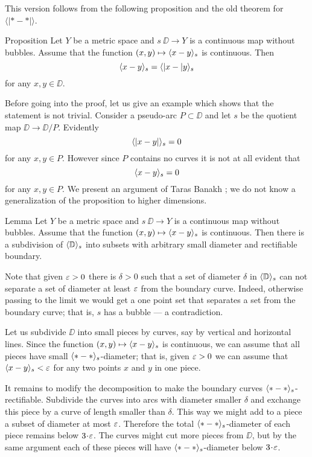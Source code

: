 This version follows from the following proposition and the old theorem for $\langle|{*}-{*}|\rangle$.
 
\begin{thm}{Proposition}\label{prop:<||>=<>}
Let $Y$ be a metric space and $s\:\DD\to Y$ is a continuous map without bubbles.
Assume that the function $(x,y)\mapsto \langle x-y\rangle_s$ is continuous.
Then 
\[\langle x-y\rangle_s=\langle|x-|y\rangle_s\]
for any $x,y\in \DD$.
\end{thm}

Before going into the proof, let us give an example which shows that the statement is not trivial.
Consider a pseudo-arc $P\subset \DD$ and let $s$ be the quotient map $\DD\to \DD/P$.
Evidently 
\[\langle|x-y|\rangle_s=0\]
for any $x,y\in P$.
However since $P$ contains no curves it is not at all evident that 
\[\langle x-y\rangle_s=0\]
for any $x,y\in P$.
We present an argument of Taras Banakh \cite{banakh};
we do not know a generalization of the proposition to higher dimensions.

\begin{thm}{Lemma}\label{lem:subdivision}
Let $Y$ be a metric space and $s\:\DD\to Y$ is a continuous map without bubbles.
Assume that the function $(x,y)\mapsto \langle x-y\rangle_s$ is continuous.
Then there is a subdivision of $\langle\mathbb{D}\rangle_s$ into subsets with arbitrary small diameter and rectifiable boundary.
\end{thm}

Note that given $\varepsilon>0$ there is $\delta>0$ such that a set of diameter $\delta$ in $\langle\mathbb{D}\rangle_s$ can not separate a set of diameter at least $\varepsilon$ from the boundary curve.
Indeed, otherwise passing to the limit we would get a one point set that separates a set from the boundary curve; that is, $s$ has a bubble --- a contradiction. 

Let us subdivide $\DD$ into small pieces by curves, say by vertical and horizontal lines.
Since the function $(x,y)\mapsto \langle x-y\rangle_s$ is continuous,
we can assume that all pieces have small $\langle{*}-{*}\rangle_s$-diameter;
that is, given $\varepsilon>0$ we can assume that $\langle x-y\rangle_s<\varepsilon$ for any two points $x$ and $y$ in one piece.

It remains to modify the decomposition to make the boundary curves $\langle{*}-{*}\rangle_s$-rectifiable.
Subdivide the curves into arcs with diameter smaller $\delta$ and exchange this piece by a curve of length smaller than $\delta$.
This way we might add to a piece a subset of diameter at most $\varepsilon$.
Therefore the total $\langle{*}-{*}\rangle_s$-diameter of each piece remains below $3\cdot\eps$.
The curves might cut more pieces from $\DD$, but by the same argument each of these pieces will have $\langle{*}-{*}\rangle_s$-diameter below $3\cdot\eps$.
\qeds

